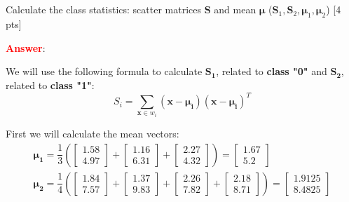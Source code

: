 \documentclass{homework}
\begin{document}
    \subsection{}
    Calculate the class statistics: scatter matrices $\mathbf{S}$ and mean $\mathbf{\mu}$ ($\mathbf{S}_{1}, \mathbf{S}_{2}, \mathbf{\mu}_{1}, \mathbf{\mu}_{2}$) [4 pts]
    
    \textbf{\textcolor{red}{Answer}}:
    
    We will use the following formula to calculate $\mathbf{S_1}$, related to \textbf{class "0"} and $\mathbf{S_2}$, related to \textbf{class "1"}:
    \[ S_i = \sum_{\mathbf{x}\in w_i} \mathbf{(x - \mu_i)(x-\mu_i)}^T \]
    
    First we will calculate the mean vectors:    
    \begin{equation*}
        \begin{gathered}
        \mathbf{\mu_1} = \dfrac{1}{3}\left(\begin{bmatrix} 1.58 \\ 4.97 \end{bmatrix} + 
        \begin{bmatrix} 1.16 \\ 6.31 \end{bmatrix} +
        \begin{bmatrix} 2.27 \\ 4.32 \end{bmatrix}\right) = \begin{bmatrix}
        1.67 \\ 5.2 \end{bmatrix} \\[5pt] 
        \mathbf{\mu_2} = \dfrac{1}{4}\left(\begin{bmatrix} 1.84 \\ 7.57\end{bmatrix} + \begin{bmatrix}   1.37 \\ 9.83 \end{bmatrix} + 
        \begin{bmatrix}     2.26 \\ 7.82\end{bmatrix} + 
        \begin{bmatrix} 2.18 \\ 8.71\end{bmatrix}
        \right) = \begin{bmatrix} 1.9125 \\ 8.4825\end{bmatrix}
        \end{gathered}
    \end{equation*}
\end{document}
